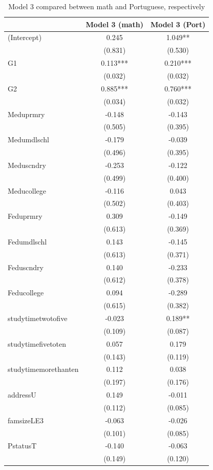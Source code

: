 \documentclass[12pt,english]{article}
\begin{document}
\begin{table}
\caption{Model 3 compared between math and Portuguese, respectively}
\label{tab:comparison3}
\centering
\begin{tabular}[t]{lcc}
\toprule
  & Model 3 (math) & Model 3 (Port)\\
\midrule
(Intercept) & 0.245 & 1.049**\\
 & (0.831) & (0.530)\\
G1 & 0.113*** & 0.210***\\
 & (0.032) & (0.032)\\
G2 & 0.885*** & 0.760***\\
 & (0.034) & (0.032)\\
Meduprmry & -0.148 & -0.143\\
 & (0.505) & (0.395)\\
Medumdlschl & -0.179 & -0.039\\
 & (0.496) & (0.395)\\
Meduscndry & -0.253 & -0.122\\
 & (0.499) & (0.400)\\
Meducollege & -0.116 & 0.043\\
 & (0.502) & (0.403)\\
Feduprmry & 0.309 & -0.149\\
 & (0.613) & (0.369)\\
Fedumdlschl & 0.143 & -0.145\\
 & (0.613) & (0.371)\\
Feduscndry & 0.140 & -0.233\\
 & (0.612) & (0.378)\\
Feducollege & 0.094 & -0.289\\
 & (0.615) & (0.382)\\
studytimetwotofive & -0.023 & 0.189**\\
 & (0.109) & (0.087)\\
studytimefivetoten & 0.057 & 0.179\\
 & (0.143) & (0.119)\\
studytimemorethanten & 0.112 & 0.038\\
 & (0.197) & (0.176)\\
addressU & 0.149 & -0.011\\
 & (0.112) & (0.085)\\
famsizeLE3 & -0.063 & -0.026\\
 & (0.101) & (0.085)\\
PstatusT & -0.140 & -0.063\\
 & (0.149) & (0.120)\\

\end{tabular}
\end{table}
\end{document}

